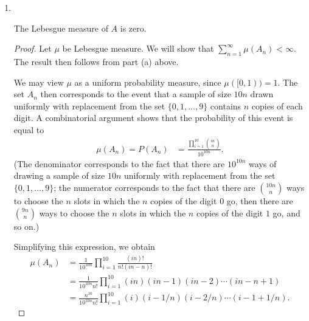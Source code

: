 \begin{enumerate}[label=(\alph*)]
\begin{proof}
  Therefore
  \begin{align*}
    A = \bigcap_{i=1}^\infty \bigcup_{j=i}^\infty A_j
  \end{align*}
  is also in the Borel $\sigma$-algebra, since it can be written using countable intersections and unions of
  intervals, and therefore also Lebesgue measurable.
\end{proof}

~\\
\item ~\\
\begin{claim*}
  The Lebesgue measure of $A$ is zero.
\end{claim*}

\begin{proof}
  Let $\mu$ be Lebesgue measure. We will show that $\sum_{n=1}^\infty \mu(A_n) < \infty$. The result then
  follows from part (a) above.

  We may view $\mu$ as a uniform probability measure, since $\mu([0, 1)) = 1$. The set $A_n$ then corresponds
  to the event that a sample of size $10n$ drawn uniformly with replacement from the set $\{0, 1, \ldots, 9\}$
  contains $n$ copies of each digit. A combinatorial argument shows that the probability of this event is equal
  to
  \begin{align*}
    \mu(A_n) = P(A_n)
    &= \frac{\prod_{i=1}^{10} {in \choose n}}{10^{10n}}.
  \end{align*}
  (The denominator corresponds to the fact that there are $10^{10n}$ ways of drawing a sample of size $10n$
  uniformly with replacement from the set $\{0, 1, \ldots, 9\}$; the numerator corresponds to the fact that
  there are ${10n \choose n}$ ways to choose the $n$ slots in which the $n$ copies of the digit $0$ go, then
  there are ${9n \choose n}$ ways to choose the $n$ slots in which the $n$ copies of the digit $1$ go, and so
  on.)

  Simplifying this expression, we obtain
  \begin{align*}
  \mu(A_n)
    &= \frac{1}{10^{10n}}\prod_{i=1}^{10}\frac{{(in)!}}{n!(in - n)!} \\
    &= \frac{1}{10^{10n}n!}\prod_{i=1}^{10} (in)(in -1)(in - 2)\cdots(in - n + 1) \\
    &= \frac{n^{10}}{10^{10n}n!}\prod_{i=1}^{10} (i)(i -1/n)(i - 2/n)\cdots(i - 1 + 1/n).
  \end{align*}


\end{proof}
\end{enumerate}
